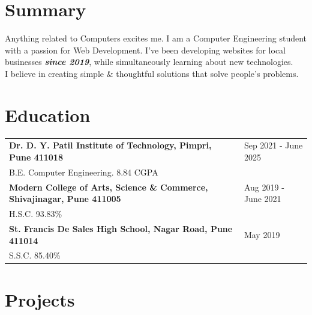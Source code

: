 \documentclass[a4paper,10pt]{article}
\begin{document}
\section{Summary}
Anything related to Computers excites me. I am a Computer Engineering student with a passion for Web Development. I've been developing websites for local businesses \textbf{\textit{since 2019}}, while simultaneously learning about new technologies.\\ I believe in creating simple \& thoughtful solutions that solve people's problems.

\section{Education}
\begin{tabularx}{\linewidth}{@{}l X@{}}	

\textbf{Dr. D. Y. Patil Institute of Technology, Pimpri, Pune 411018} & \hfill 
Sep 2021 - June 2025 \\ \vspace*{2mm}
B.E. Computer Engineering. 8.84 CGPA \\ 

\textbf{Modern College of Arts, Science \& Commerce, Shivajinagar, Pune 411005} & \hfill 
Aug 2019 - June 2021 \\ \vspace*{2mm}
H.S.C. 93.83\% \\ 

\textbf{St. Francis De Sales High School, Nagar Road, Pune 411014} & \hfill 
May 2019 \\ 
S.S.C. 85.40\% \\

\end{tabularx}
  
\section{Projects}
\end{document}
